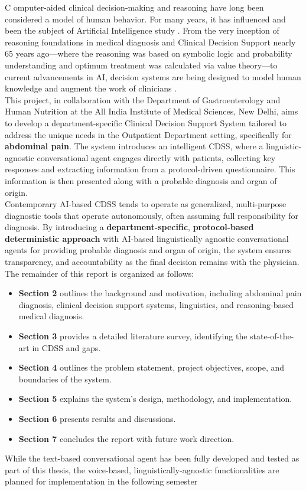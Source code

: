 \lettrine{C}{ }omputer-aided clinical decision-making and reasoning have long been considered a model of human behavior. For many years, it has influenced and been the subject of Artificial Intelligence study \cite{cohen2022introducing}. From the very inception of reasoning foundations in medical diagnosis and Clinical Decision Support nearly 65 years ago---where the reasoning was based on symbolic logic and probability understanding and optimum treatment was calculated via value theory---to current advancements in AI, decision systems are being designed to model human knowledge and augment the work of clinicians \cite{ledley1959reasoning, rajkomar2019machine}.\\

\noindent This project, in collaboration with the Department of Gastroenterology and Human Nutrition at the All India Institute of Medical Sciences, New Delhi, aims to develop a department-specific Clinical Decision Support System tailored to address the unique needs in the Outpatient Department setting, specifically for \textcolor{TUMRed}{\textbf{abdominal pain}}. The system introduces an intelligent CDSS, where a linguistic-agnostic conversational agent engages directly with patients, collecting key responses and extracting information from a protocol-driven questionnaire. This information is then presented along with a probable diagnosis and organ of origin.\\

\noindent Contemporary AI-based CDSS tends to operate as generalized, multi-purpose diagnostic tools that operate autonomously, often assuming full responsibility for diagnosis. By introducing a \textcolor{TUMRed}{\textbf{department-specific}}, \textcolor{TUMRed}{\textbf{protocol-based deterministic approach}} with AI-based linguistically agnostic conversational agents for providing probable diagnosis and organ of origin, the system ensures transparency, and accountability as the final decision remains with the physician.\\

\noindent The remainder of this report is organized as follows:
\begin{itemize}
    \item \textcolor{TUMRed}{\textbf{Section 2}} outlines the background and motivation, including abdominal pain diagnosis, clinical decision support systems, linguistics, and reasoning-based medical diagnosis.
    \item \textcolor{TUMRed}{\textbf{Section 3}} provides a detailed literature survey, identifying the state-of-the-art in CDSS and gaps.
    \item \textcolor{TUMRed}{\textbf{Section 4}} outlines the problem statement, project objectives, scope, and boundaries of the system.
    \item \textcolor{TUMRed}{\textbf{Section 5}} explains the system's design, methodology, and implementation.
    \item \textcolor{TUMRed}{\textbf{Section 6}} presents results and discussions.
    \item \textcolor{TUMRed}{\textbf{Section 7}} concludes the report with future work direction.
\end{itemize}

\noindent While the text-based conversational agent has been fully developed and tested as part of this thesis, the voice-based, linguistically-agnostic functionalities are planned for implementation in the following semester
